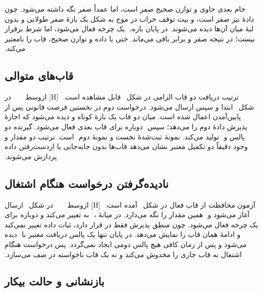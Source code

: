 ‫خام بعدی حاوی  و توازن صحیح صفر است، اما  عمداً صفر نگه داشته
‫می‌شود. چون  دادهٔ  نیز صفر است،  و بیت توقف خراب در موج به
‫شکل یک بازهٔ صفر طولانی و بدون لبهٔ میان آن‌ها دیده می‌شوند. در پایان بازه،
‫ یک چرخه فعال می‌شود، اما شرط  برقرار نیست؛ در
‫نتیجه  صفر و  برابر  باقی می‌ماند. حتی با
‫داده و توازن صحیح،  قاب را نامعتبر می‌کند.
‫
‫
‫\subsection{قاب‌های متوالی}
‫
‫ترتیب دریافت دو قاب الزامی در شکل~ قابل مشاهده است.
‫
‫[H]
‫‌ازوسط
‫
‫
‫
‫
‫
‫در شکل~ ابتدا  و سپس  ارسال می‌شود. درخواست
‫دوم در نخستین فرصت قانونی پس از پایین‌آمدن  اعمال شده است. میان دو قاب یک بازهٔ
‫کوتاه  و  دیده می‌شود که اجازهٔ پذیرش دادهٔ دوم را می‌دهد؛ سپس
‫ دوباره برای قاب بعدی فعال می‌شود. گیرنده دو پالس  و
‫ تولید می‌کند. نمونهٔ ثبت‌شدهٔ نخست  و نمونهٔ دوم
‫ است. ترتیب دو مقدار و وجود دقیقاً دو تکمیل معتبر نشان می‌دهد قاب‌ها بدون
‫جابه‌جایی یا از‌دست‌رفتن داده پردازش می‌شوند.
‫
‫
‫\subsection{نادیده‌گرفتن درخواست هنگام اشتغال}
‫
‫آزمون محافظت از قاب فعال در شکل~ آمده است.
‫
‫[H]
‫‌ازوسط
‫
‫
‫
‫
‫
‫در شکل~ ارسال  آغاز می‌شود و
‫ همین مقدار را نگه می‌دارد. در میانهٔ ،
‫ به  تغییر می‌کند و  دوباره برای یک چرخه فعال
‫می‌شود. چون منطق پذیرش فقط در  قرار دارد، ثبات داده تغییر نمی‌کند و 
‫ادامهٔ همان قاب  را نمایش می‌دهد. در پایان تنها یک پالس دریافت معتبر با
‫ دیده می‌شود و پس از زمان کافی هیچ پالس دومی ایجاد نمی‌گردد. پس
‫درخواست هنگام اشتغال نه قاب جاری را مخدوش می‌کند و نه یک قاب ناخواسته در صف می‌سازد.
‫
‫
‫\subsection{بازنشانی و حالت بیکار}
